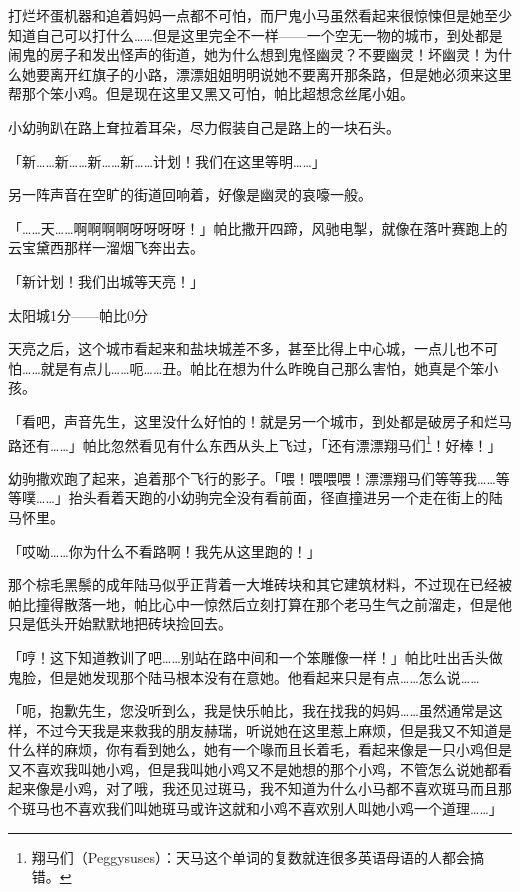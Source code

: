 打烂坏蛋机器和追着妈妈一点都不可怕，而尸鬼小马虽然看起来很惊悚但是她至少知道自己可以打什么……但是这里完全不一样——一个空无一物的城市，到处都是闹鬼的房子和发出怪声的街道，她为什么想到鬼怪幽灵？不要幽灵！坏幽灵！为什么她要离开红旗子的小路，漂漂姐姐明明说她不要离开那条路，但是她必须来这里帮那个笨小鸡。但是现在这里又黑又可怕，帕比超想念丝尾小姐。

小幼驹趴在路上耷拉着耳朵，尽力假装自己是路上的一块石头。

「新……新……新……新……计划！我们在这里等明……」

另一阵声音在空旷的街道回响着，好像是幽灵的哀嚎一般。

「……天……啊啊啊啊呀呀呀呀！」帕比撒开四蹄，风驰电掣，就像在落叶赛跑上的云宝黛西那样一溜烟飞奔出去。

「新计划！我们出城等天亮！」

\begin{center}
太阳城1分——帕比0分
\end{center}

\horizonline


天亮之后，这个城市看起来和盐块城差不多，甚至比得上中心城，一点儿也不可怕……就是有点儿……呃……丑。帕比在想为什么昨晚自己那么害怕，她真是个笨小孩。

「看吧，声音先生，这里没什么好怕的！就是另一个城市，到处都是破房子和烂马路还有……」帕比忽然看见有什么东西从头上飞过，「还有漂漂翔马们\footnote{翔马们（Peggysuses）：天马这个单词的复数就连很多英语母语的人都会搞错。}！好棒！」

幼驹撒欢跑了起来，追着那个飞行的影子。「喂！喂喂喂！漂漂翔马们等等我……等等噗……」抬头看着天跑的小幼驹完全没有看前面，径直撞进另一个走在街上的陆马怀里。

「哎呦……你为什么不看路啊！我先从这里跑的！」

那个棕毛黑鬃的成年陆马似乎正背着一大堆砖块和其它建筑材料，不过现在已经被帕比撞得散落一地，帕比心中一惊然后立刻打算在那个老马生气之前溜走，但是他只是低头开始默默地把砖块捡回去。

「哼！这下知道教训了吧……别站在路中间和一个笨雕像一样！」帕比吐出舌头做鬼脸，但是她发现那个陆马根本没有在意她。他看起来只是有点……怎么说……

「呃，抱歉先生，您没听到么，我是快乐帕比，我在找我的妈妈……虽然通常是这样，不过今天我是来救我的朋友赫瑞，听说她在这里惹上麻烦，但是我又不知道是什么样的麻烦，你有看到她么，她有一个喙而且长着毛，看起来像是一只小鸡但是又不喜欢我叫她小鸡，但是我叫她小鸡又不是她想的那个小鸡，不管怎么说她都看起来像是小鸡，对了哦，我还见过斑马，我不知道为什么小马都不喜欢斑马而且那个斑马也不喜欢我们叫她斑马或许这就和小鸡不喜欢别人叫她小鸡一个道理……」

